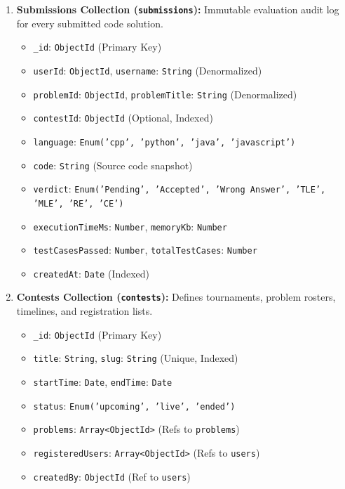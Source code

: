 \documentclass[12pt,a4paper]{report}
\begin{document}
\begin{enumerate}[leftmargin=*, label=\bfseries\arabic*.]
  \item \textbf{Submissions Collection (\texttt{submissions}):} Immutable evaluation audit log for every submitted code solution.
  \begin{itemize}
    \item \texttt{\_id}: \texttt{ObjectId} (Primary Key)
    \item \texttt{userId}: \texttt{ObjectId}, \texttt{username}: \texttt{String} (Denormalized)
    \item \texttt{problemId}: \texttt{ObjectId}, \texttt{problemTitle}: \texttt{String} (Denormalized)
    \item \texttt{contestId}: \texttt{ObjectId} (Optional, Indexed)
    \item \texttt{language}: \texttt{Enum('cpp', 'python', 'java', 'javascript')}
    \item \texttt{code}: \texttt{String} (Source code snapshot)
    \item \texttt{verdict}: \texttt{Enum('Pending', 'Accepted', 'Wrong Answer', 'TLE', 'MLE', 'RE', 'CE')}
    \item \texttt{executionTimeMs}: \texttt{Number}, \texttt{memoryKb}: \texttt{Number}
    \item \texttt{testCasesPassed}: \texttt{Number}, \texttt{totalTestCases}: \texttt{Number}
    \item \texttt{createdAt}: \texttt{Date} (Indexed)
  \end{itemize}

  \item \textbf{Contests Collection (\texttt{contests}):} Defines tournaments, problem rosters, timelines, and registration lists.
  \begin{itemize}
    \item \texttt{\_id}: \texttt{ObjectId} (Primary Key)
    \item \texttt{title}: \texttt{String}, \texttt{slug}: \texttt{String} (Unique, Indexed)
    \item \texttt{startTime}: \texttt{Date}, \texttt{endTime}: \texttt{Date}
    \item \texttt{status}: \texttt{Enum('upcoming', 'live', 'ended')}
    \item \texttt{problems}: \texttt{Array<ObjectId>} (Refs to \texttt{problems})
    \item \texttt{registeredUsers}: \texttt{Array<ObjectId>} (Refs to \texttt{users})
    \item \texttt{createdBy}: \texttt{ObjectId} (Ref to \texttt{users})
  \end{itemize}


\end{enumerate}
\end{document}
